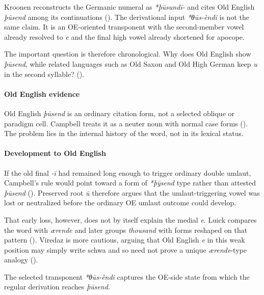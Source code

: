 \documentclass[
  british,
  a4paper,
]{article}
\begin{document}
Kroonen reconstructs the Germanic numeral as \emph{*þūsundī-} and cites
Old English \emph{þūsend} among its continuations
(). The derivational input
\emph{*θūs-èndi} is not the same claim. It is an OE-oriented transponent
with the second-member vowel already resolved to \emph{e} and the final
high vowel already shortened for apocope.

The important question is therefore chronological. Why does Old English
show \emph{þūsend}, while related languages such as Old Saxon and Old
High German keep \emph{u} in the second syllable?
().

\paragraph{Old English evidence}\label{old-english-evidence-30}

Old English \emph{þūsend} is an ordinary citation form, not a selected
oblique or paradigm cell. Campbell treats it as a neuter noun with
normal case forms (). The problem lies in the internal history of the word, not in its
lexical status.

\paragraph{Development to Old
English}\label{development-to-old-english-30}

If the old final \emph{-ī} had remained long enough to trigger ordinary
double umlaut, Campbell's rule would point toward a form of
\emph{*þȳsend} type rather than attested \emph{þūsend}
(). Preserved root
\emph{ū} therefore argues that the umlaut-triggering vowel was lost or
neutralized before the ordinary OE umlaut outcome could develop.

That early loss, however, does not by itself explain the medial
\emph{e}. Luick compares the word with \emph{ærende} and later groups
\emph{thousand} with forms reshaped on that pattern
(). Viredaz
is more cautious, arguing that Old English \emph{e} in this weak
position may simply write schwa and so need not prove a unique
\emph{ærende}-type analogy
().

The selected transponent \emph{*θūs-èndi} captures the OE-side state
from which the regular derivation reaches \emph{þūsend}.
\end{document}
